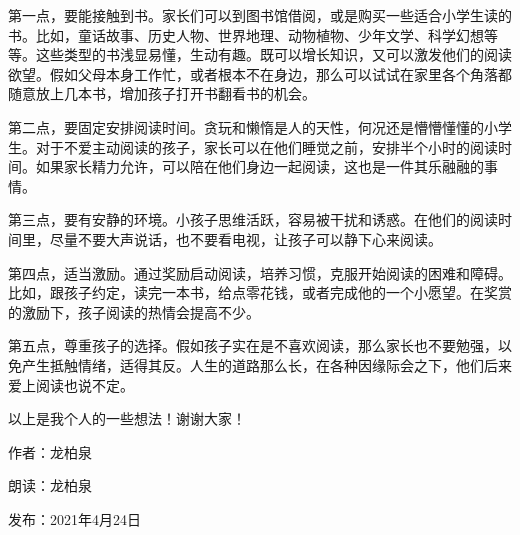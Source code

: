 第一点，要能接触到书。家长们可以到图书馆借阅，或是购买一些适合小学生读的书。比如，童话故事、历史人物、世界地理、动物植物、少年文学、科学幻想等等。这些类型的书浅显易懂，生动有趣。既可以增长知识，又可以激发他们的阅读欲望。假如父母本身工作忙，或者根本不在身边，那么可以试试在家里各个角落都随意放上几本书，增加孩子打开书翻看书的机会。

 

第二点，要固定安排阅读时间。贪玩和懒惰是人的天性，何况还是懵懵懂懂的小学生。对于不爱主动阅读的孩子，家长可以在他们睡觉之前，安排半个小时的阅读时间。如果家长精力允许，可以陪在他们身边一起阅读，这也是一件其乐融融的事情。

 

第三点，要有安静的环境。小孩子思维活跃，容易被干扰和诱惑。在他们的阅读时间里，尽量不要大声说话，也不要看电视，让孩子可以静下心来阅读。

 

第四点，适当激励。通过奖励启动阅读，培养习惯，克服开始阅读的困难和障碍。比如，跟孩子约定，读完一本书，给点零花钱，或者完成他的一个小愿望。在奖赏的激励下，孩子阅读的热情会提高不少。

 

第五点，尊重孩子的选择。假如孩子实在是不喜欢阅读，那么家长也不要勉强，以免产生抵触情绪，适得其反。人生的道路那么长，在各种因缘际会之下，他们后来爱上阅读也说不定。

 

以上是我个人的一些想法！谢谢大家！


\vspace{10pt}


作者：龙柏泉

朗读：龙柏泉

发布：2021年4月24日








\vspace{10pt}

\hline

